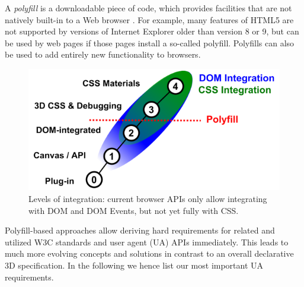 \documentclass{acmsiggraph}
\begin{document}
A \textit{polyfill} is a downloadable piece of code, which provides facilities that are not natively built-in to a Web browser \cite{Sharp2010}. For example, many features of HTML5 are not supported by versions of Internet Explorer older than version 8 or 9, but can be used by web pages if those pages install a so-called polyfill. Polyfills can also be used to add entirely new functionality to browsers.

\begin{figure}
  \centering
  \includegraphics[width=0.9\columnwidth]{images/polyfill.png}
  \caption{Levels of integration: current browser APIs only allow integrating with DOM and DOM Events, but not yet fully with CSS.}
  \label{fig:polyInt}
\end{figure}

Polyfill-based approaches allow deriving hard requirements for related and utilized W3C standards and user agent (UA) APIs immediately. This leads to much more evolving concepts and solutions in contrast to an overall declarative 3D specification. In the following we hence list our most important UA requirements.
\end{document}
